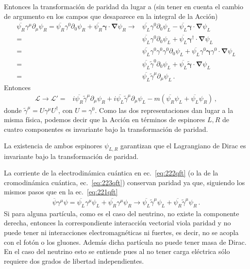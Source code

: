 Entonces la transformación de paridad da lugar a (sin tener en cuenta el cambio de argumento en los campos que desaparece en la integral de la Acción)
\begin{align}
  \overline{\psi_R}\gamma^\mu\partial_\mu\psi_R=\overline{\psi_R}\gamma^0\partial_0\psi_R+\overline{\psi_R}\boldsymbol{\gamma}\cdot\boldsymbol{\nabla}\psi_R 
\to&\overline{\psi_L}\gamma^0\partial_0\psi_L-\overline{\psi_L}\boldsymbol{\gamma}\cdot\boldsymbol{\nabla}\psi_L\nonumber\\
=&\overline{\psi_L}\gamma^0\partial_0\psi_L+\overline{\psi_L}\boldsymbol{\gamma}^\dagger\cdot\boldsymbol{\nabla}\psi_L\nonumber\\
=&\overline{\psi_L}\gamma^0\gamma^0\gamma^0\partial_0\psi_L+\overline{\psi_L}\gamma^0\boldsymbol{\gamma}\gamma^0\cdot\boldsymbol{\nabla}\psi_L\nonumber\\
=&\overline{\psi_L}\tilde\gamma^0\partial_0\psi_L+\overline{\psi_L}\tilde{\boldsymbol{\gamma}}\cdot\boldsymbol{\nabla}\psi_L\nonumber\\
=&\overline{\psi_L}\tilde\gamma^\mu\partial_\mu\psi_L\,.
\end{align}
Entonces
\begin{align}
   \mathcal{L}\to\mathcal{L}'=&i\overline{\psi_R}\tilde\gamma^\mu\partial_\mu\psi_R+i\overline{\psi_L}\tilde\gamma^\mu\partial_\mu\psi_L-m(\overline{\psi_R}\psi_L+\overline{\psi_L}\psi_R)\,,
\end{align}
donde $\tilde\gamma^\mu=U\gamma^\mu U^\dagger$, con $U=\gamma^0$. Como las dos representaciones dan lugar a la misma física, podemos decir que la Acción en términos de espinores $L,R$ de cuatro componentes es invariante bajo la transformación de paridad.

La existencia de ambos espinores $\psi_{L,R}$ garantizan que el Lagrangiano de Dirac es invariante bajo la transformación de paridad. 

La corriente de la electrodinámica cuántica en ec.~\eqref{eq:222qft} (o la de la cromodinámica cuántica, ec.~\eqref{eq:223qft}) conservan paridad ya que, siguiendo los mismos pasos que en la ec.~\eqref{eq:221qft}
\begin{align}
  \label{eq:224qft}
  \overline{\psi}\gamma^\mu\psi=\overline{\psi_L}\gamma^\mu\psi_L+\overline{\psi_R}\gamma^\mu\psi_R\to\overline{\psi_L}\tilde{\gamma}^\mu\psi_L+\overline{\psi_R}\tilde{\gamma}^\mu\psi_R\,.
\end{align}
Si para alguna partícula, como es el caso del neutrino, no existe la componente derecha, entonces la correspondiente interacción vectorial viola paridad y no puede tener ni interacciones electromagnéticas ni fuertes, es decir, no se acopla con el fotón o los gluones. Además dicha partícula no puede tener masa de Dirac. En el caso del neutrino esto se entiende pues al no tener carga eléctrica sólo requiere dos grados de libertad independientes.

